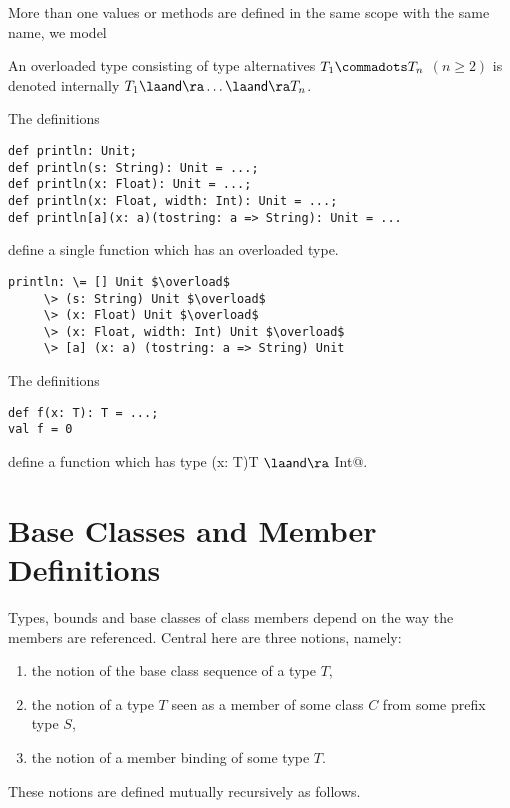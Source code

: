 \documentclass[11pt]{report}
\begin{document}
More than one values or methods are defined in the same scope with the
same name, we model

An overloaded type consisting of type alternatives $T_1 \commadots
T_n$ $(n \geq 2)$ is denoted internally $T_1 \overload \ldots
\overload T_n$.

\example The definitions
\begin{verbatim}
def println: Unit;
def println(s: String): Unit = ...;
def println(x: Float): Unit = ...;
def println(x: Float, width: Int): Unit = ...;
def println[a](x: a)(tostring: a => String): Unit = ...
\end{verbatim}
define a single function \verb@println@ which has an overloaded
type.
\begin{verbatim}
println: \= [] Unit $\overload$
	 \> (s: String) Unit $\overload$
	 \> (x: Float) Unit $\overload$
	 \> (x: Float, width: Int) Unit $\overload$
	 \> [a] (x: a) (tostring: a => String) Unit
\end{verbatim}

\example The definitions
\begin{verbatim}
def f(x: T): T = ...;
val f = 0
\end{verbatim}
define a function \verb@f@ which has type \verb@(x: T)T $\overload$ Int@.

\section{Base Classes and Member Definitions}
\label{sec:base-classes}

Types, bounds and base classes of class members depend on the way the
members are referenced.  Central here are three notions, namely:
\begin{enumerate}
\item the notion of the base class sequence of a type $T$,
\item the notion of a type $T$ seen as a member of some class $C$ from some 
      prefix type $S$,
\item the notion of a member binding of some type $T$.
\end{enumerate}
These notions are defined mutually recursively as follows.
\end{document}
